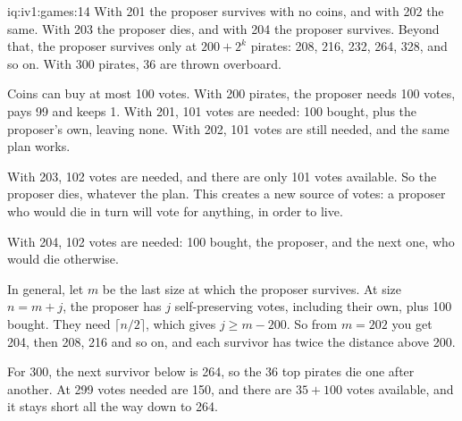 \begin{solution}{iq:iv1:games:14}
With 201 the proposer survives with no coins, and with 202 the same. With 203 the proposer dies, and with 204 the proposer survives. Beyond that, the proposer survives only at $200 + 2^k$ pirates: 208, 216, 232, 264, 328, and so on. With 300 pirates, 36 are thrown overboard.

Coins can buy at most 100 votes. With 200 pirates, the proposer needs 100 votes, pays 99 and keeps 1. With 201, 101 votes are needed: 100 bought, plus the proposer's own, leaving none. With 202, 101 votes are still needed, and the same plan works.

With 203, 102 votes are needed, and there are only 101 votes available. So the proposer dies, whatever the plan. This creates a new source of votes: a proposer who would die in turn will vote for anything, in order to live.

With 204, 102 votes are needed: 100 bought, the proposer, and the next one, who would die otherwise.

In general, let $m$ be the last size at which the proposer survives. At size $n = m + j$, the proposer has $j$ self-preserving votes, including their own, plus 100 bought. They need $\lceil n/2 \rceil$, which gives $j \ge m - 200$. So from $m = 202$ you get 204, then 208, 216 and so on, and each survivor has twice the distance above 200.

For 300, the next survivor below is 264, so the 36 top pirates die one after another. At 299 votes needed are 150, and there are $35 + 100$ votes available, and it stays short all the way down to 264.

\end{solution}

